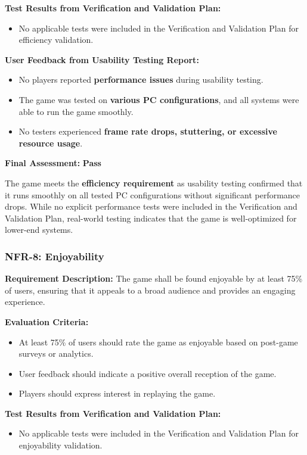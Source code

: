 \documentclass[12pt, titlepage]{article}
\begin{document}
\textbf{Test Results from Verification and Validation Plan:}  
\begin{itemize}
    \item No applicable tests were included in the Verification and Validation Plan for efficiency validation.
\end{itemize}

\textbf{User Feedback from Usability Testing Report:}  
\begin{itemize}
    \item No players reported \textbf{performance issues} during usability testing.
    \item The game was tested on \textbf{various PC configurations}, and all systems were able to run the game smoothly.
    \item No testers experienced \textbf{frame rate drops, stuttering, or excessive resource usage}.
\end{itemize}

\textbf{Final Assessment:} \textbf{Pass} 
 
The game meets the \textbf{efficiency requirement} as usability testing confirmed that it runs smoothly on all tested PC configurations without significant performance drops. While no explicit performance tests were included in the Verification and Validation Plan, real-world testing indicates that the game is well-optimized for lower-end systems.


\subsubsection{NFR-8: Enjoyability}

\textbf{Requirement Description:}  
The game shall be found enjoyable by at least 75\% of users, ensuring that it appeals to a broad audience and provides an engaging experience.

\textbf{Evaluation Criteria:}  
\begin{itemize}
    \item At least 75\% of users should rate the game as enjoyable based on post-game surveys or analytics.
    \item User feedback should indicate a positive overall reception of the game.
    \item Players should express interest in replaying the game.
\end{itemize}

\textbf{Test Results from Verification and Validation Plan:}  
\begin{itemize}
    \item No applicable tests were included in the Verification and Validation Plan for enjoyability validation.
\end{itemize}
\end{document}
